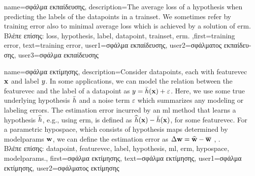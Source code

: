 {name={\foreignlanguage{greek}{σφάλμα εκπαίδευσης}},
	description={The average \gls{loss} of a \gls{hypothesis} when 
		predicting the \gls{label}s of the \gls{datapoint}s in a \gls{trainset}. 
		We sometimes refer by training error also to minimal average \gls{loss} 
		which is achieved by a solution of \gls{erm}.\\
		\foreignlanguage{greek}{Βλέπε επίσης:} \gls{loss}, \gls{hypothesis}, \gls{label}, \gls{datapoint}, \gls{trainset}, \gls{erm}.
		},first={training error},
		text={training error},
		user1={\foreignlanguage{greek}{σφάλμα εκπαίδευσης}}, %
  		user2={\foreignlanguage{greek}{σφάλματος εκπαίδευσης}}, %
		user3={\foreignlanguage{greek}{σφάλμα εκπαίδευσης}} %
}

{name={\foreignlanguage{greek}{σφάλμα εκτίμησης}},
	description={Consider \gls{datapoint}s, each with \gls{featurevec} ${\bf x}$ and \gls{label} 
		$y$. In some applications, we can model the relation between the \gls{featurevec} and the \gls{label}
		of a \gls{datapoint} as $y = \bar{h}({\bf x}) + \varepsilon$. Here, we 
		use some true underlying \gls{hypothesis} $\bar{h}$ and a noise term $\varepsilon$ 
		which summarizes any modeling or labeling errors. The estimation error incurred by an \gls{ml} 
		method that learns a \gls{hypothesis} $\widehat{h}$, e.g., using \gls{erm}, is defined as 
		$\widehat{h}({\bf x}) - \bar{h}({\bf x})$, for some \gls{featurevec}. 
		For a parametric \gls{hypospace}, which consists of \gls{hypothesis} maps determined by 
		\gls{modelparams} ${\bf w}$, we can define the estimation error as $\Delta {\bf w} = \widehat{{\bf w}} - \overline{{\bf w}}$ \cite{kay}, \cite{hastie01statisticallearning}.\\
		\foreignlanguage{greek}{Βλέπε επίσης:} \gls{datapoint}, \gls{featurevec}, \gls{label}, \gls{hypothesis}, \gls{ml}, \gls{erm}, \gls{hypospace}, \gls{modelparams}.},
	first={\foreignlanguage{greek}{σφάλμα εκτίμησης}},
	text={\foreignlanguage{greek}{σφάλμα εκτίμησης}},
	user1={\foreignlanguage{greek}{σφάλμα εκτίμησης}}, %
    	user2={\foreignlanguage{greek}{σφάλματος εκτίμησης}} %
}

